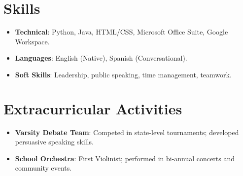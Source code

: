 \documentclass[11pt, a4paper]{article}
\begin{document}
\section*{Skills}
\begin{itemize}
    \item \textbf{Technical}: Python, Java, HTML/CSS, Microsoft Office Suite, Google Workspace.
    \item \textbf{Languages}: English (Native), Spanish (Conversational).
    \item \textbf{Soft Skills}: Leadership, public speaking, time management, teamwork.
\end{itemize}

\section*{Extracurricular Activities}
\begin{itemize}
    \item \textbf{Varsity Debate Team}: Competed in state-level tournaments; developed persuasive speaking skills.
    \item \textbf{School Orchestra}: First Violinist; performed in bi-annual concerts and community events.
\end{itemize}
\end{document}
